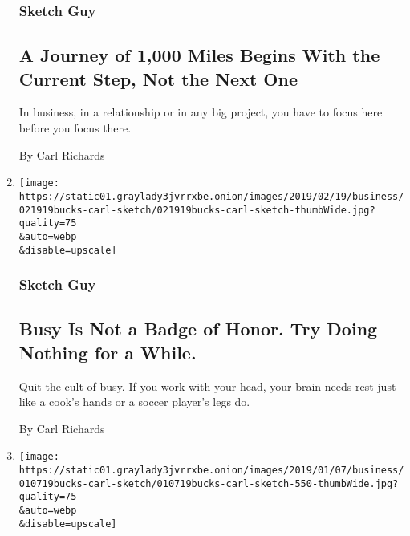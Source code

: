 \begin{enumerate}
  \hypertarget{sketch-guy-6}{%
  \subsubsection{Sketch Guy}\label{sketch-guy-6}}

  \hypertarget{a-journey-of-1000-miles-begins-with-the-current-step-not-the-next-one}{%
  \subsection{A Journey of 1,000 Miles Begins With the Current Step, Not
  the Next
  One}\label{a-journey-of-1000-miles-begins-with-the-current-step-not-the-next-one}}

  In business, in a relationship or in any big project, you have to
  focus here before you focus there.

  By Carl Richards
\item
  \href{/2019/02/19/your-money/sketch-guy-knowledge-workers-need-rest.html}{}

  \texttt{[image: https://static01.graylady3jvrrxbe.onion/images/2019/02/19/business/021919bucks-carl-sketch/021919bucks-carl-sketch-thumbWide.jpg?quality=75\\\&auto=webp\\\&disable=upscale]}

  \hypertarget{sketch-guy-7}{%
  \subsubsection{Sketch Guy}\label{sketch-guy-7}}

  \hypertarget{busy-is-not-a-badge-of-honor-try-doing-nothing-for-a-while}{%
  \subsection{Busy Is Not a Badge of Honor. Try Doing Nothing for a
  While.}\label{busy-is-not-a-badge-of-honor-try-doing-nothing-for-a-while}}

  Quit the cult of busy. If you work with your head, your brain needs
  rest just like a cook's hands or a soccer player's legs do.

  By Carl Richards
\item
  \href{/2019/01/07/your-money/2019-self-improvement-adventure.html}{}

  \texttt{[image: https://static01.graylady3jvrrxbe.onion/images/2019/01/07/business/010719bucks-carl-sketch/010719bucks-carl-sketch-550-thumbWide.jpg?quality=75\\\&auto=webp\\\&disable=upscale]}

  \hypertarget{sketch-guy-8}{%
}
\end{enumerate}
